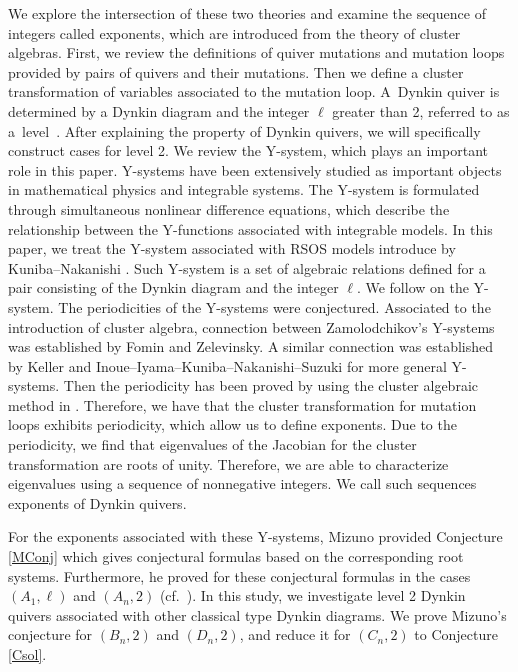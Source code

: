 \documentclass[10pt,a4paper]{amsart}
\numberwithin{equation}{section}
\begin{document}
We explore the intersection of these two theories and examine the sequence of integers called exponents, which are introduced from the theory of cluster algebras.
First, we review the definitions of quiver mutations and mutation loops provided by pairs of quivers and their mutations.
Then we define a cluster transformation of variables associated to the mutation loop.
A~Dynkin quiver is determined by a Dynkin diagram and the integer $\ell$ greater than 2, referred to as a~level~\mbox{\cite{IIKKN, IIKKN2}}.
After explaining the property of Dynkin quivers, we will specifically construct cases for level 2.
We review the Y-system, which plays an important role in this paper.
Y-systems have been extensively studied as important objects in mathematical physics and integrable systems.
The Y-system is formulated through simultaneous nonlinear difference equations, which describe the relationship between the Y-functions associated with integrable models.
In this paper, we treat the Y-system associated with RSOS models introduce by Kuniba--Nakanishi \cite{KN}.
Such Y-system is a set of algebraic relations defined for a pair consisting of the Dynkin diagram and the integer $\ell$.
We follow \cite{KNS} on the Y-system.
The periodicities of the Y-systems were conjectured.
Associated to the introduction of cluster algebra, connection between Zamolodchikov's Y-systems was established by Fomin and Zelevinsky.
A similar connection was established by Keller and Inoue--Iyama--Kuniba--Nakanishi--Suzuki for more general Y-systems.
Then the periodicity has been proved by using the cluster algebraic method in \cite{IIKKN, IIKKN2, K}.
Therefore, we have that the cluster transformation for mutation loops exhibits periodicity, which allow us to define exponents.
Due to the periodicity, we find that eigenvalues of the Jacobian for the cluster transformation are roots of unity.
Therefore, we are able to characterize eigenvalues using a sequence of nonnegative integers.
We call such sequences exponents of Dynkin quivers.

For the exponents associated with these Y-systems, Mizuno provided Conjecture \ref{MConj} which gives conjectural formulas based on the corresponding root systems.
Furthermore, he proved for these conjectural formulas in the cases $(A_1,\ell)$ and $(A_n,2)$ (cf.\ \cite{M}).
In this study, we investigate level 2 Dynkin quivers associated with other classical type Dynkin diagrams.
We prove Mizuno's conjecture for $(B_n,2)$ and $(D_n,2)$, and reduce it for $(C_n,2)$ to Conjecture \ref{Csol}.
	
\end{document}
